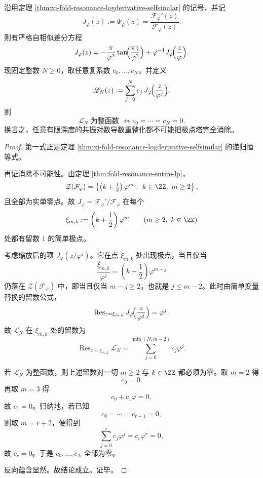 \begin{theorem}[共振对数导数的有限深度极点消除不可能性]\label{thm:xi-time-part9vk-logderivative-finite-depth-pole-cancellation-impossible}
沿用定理 \ref{thm:xi-fold-resonance-logderivative-selfsimilar} 的记号，并记
\[
J_\varphi(z):=\Psi_\varphi(z)=\frac{\mathcal F_\varphi'(z)}{\mathcal F_\varphi(z)}.
\]
则有严格自相似差分方程
\[
J_\varphi(z)=
-\frac{\pi}{\varphi^2}\tan\!\Bigl(\frac{\pi z}{\varphi^2}\Bigr)
+\varphi^{-1}J_\varphi\!\Bigl(\frac{z}{\varphi}\Bigr).
\]
现固定整数 \(N\ge 0\)，取任意复系数 \(c_0,\dots,c_N\)，并定义
\[
\mathscr L_N(z):=
\sum_{j=0}^{N}c_j\,J_\varphi\!\Bigl(\frac{z}{\varphi^j}\Bigr).
\]
则
\[
\mathscr L_N \text{ 为整函数 }
\Longleftrightarrow
c_0=\cdots=c_N=0.
\]
换言之，任意有限深度的共振对数导数重整化都不可能把极点塔完全消除。
\end{theorem}
\begin{proof}
第一式正是定理 \ref{thm:xi-fold-resonance-logderivative-selfsimilar} 的递归恒等式。

再证消除不可能性。由定理 \ref{thm:fold-resonance-entire-lp}，
\[
\mathcal Z(\mathcal F_\varphi)=
\left\{
\left(k+\tfrac12\right)\varphi^m:\ k\in\ZZ,\ m\ge 2
\right\},
\]
且全部为实单零点。故 \(J_\varphi=\mathcal F_\varphi'/\mathcal F_\varphi\) 在每个
\[
\xi_{m,k}:=\left(k+\frac12\right)\varphi^m
\qquad (m\ge 2,\ k\in\ZZ)
\]
处都有留数 \(1\) 的简单极点。

考虑缩放后的项 \(J_\varphi(z/\varphi^j)\)。它在点 \(\xi_{m,k}\) 处出现极点，当且仅当
\[
\frac{\xi_{m,k}}{\varphi^j}
=
\left(k+\frac12\right)\varphi^{m-j}
\]
仍落在 \(\mathcal Z(\mathcal F_\varphi)\) 中，即当且仅当 \(m-j\ge 2\)，也就是 \(j\le m-2\)。此时由简单变量替换的留数公式，
\[
\operatorname{Res}_{z=\xi_{m,k}}
J_\varphi\!\Bigl(\frac{z}{\varphi^j}\Bigr)
=
\varphi^j.
\]
故 \(\mathscr L_N\) 在 \(\xi_{m,k}\) 处的留数为
\[
\operatorname{Res}_{z=\xi_{m,k}}\mathscr L_N
=
\sum_{j=0}^{\min(N,m-2)}c_j\varphi^j.
\]

若 \(\mathscr L_N\) 为整函数，则上述留数对一切 \(m\ge 2\) 与 \(k\in\ZZ\) 都必须为零。取 \(m=2\) 得
\[
c_0=0.
\]
再取 \(m=3\) 得
\[
c_0+c_1\varphi=0,
\]
故 \(c_1=0\)。归纳地，若已知
\[
c_0=\cdots=c_{r-1}=0,
\]
则取 \(m=r+2\)，便得到
\[
\sum_{j=0}^{r}c_j\varphi^j=c_r\varphi^r=0,
\]
故 \(c_r=0\)。于是 \(c_0,\dots,c_N\) 全部为零。

反向蕴含显然。故结论成立。证毕。
\end{proof}

